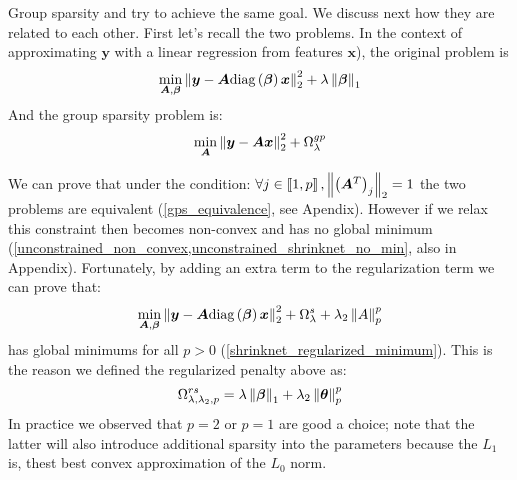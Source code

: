 Group sparsity and \shrink try to achieve the same goal. We discuss next how
they are related to each other. First let's recall the two problems. In the context of approximating $\bm{y}$ with a linear regression from features $\bm{x}$), the
original \shrink problem is 
%
\begin{equation}
  \min_{\bm{A}, \bm{\beta}} \left\lVert\bm{y} - \bm{A}\text{diag}\left(\bm{\beta}\right)\bm{x}\right\rVert_2^2 + \lambda \left\lVert\bm{\beta}\right\rVert_1
\end{equation}
%
And the group sparsity problem is:
%
\begin{equation}
  \min_{\bm{A}} \left\lVert\bm{y} - \bm{A}\bm{x}\right\rVert_2^2 + \Omega_\lambda^{gp}
\end{equation}
%

We can prove that under the condition: $\forall j\in \left\llbracket1, p\right\rrbracket,
\left\lVert\left(\bm{A}^T\right)_j\right\rVert_2 = 1$ the two problems are equivalent
(\cref{gps_equivalence}, see Apendix). However if we relax this constraint then \shrink
becomes non-convex and has no global minimum
(\cref{unconstrained_non_convex,unconstrained_shrinknet_no_min}, also in Appendix). Fortunately,
by adding an extra term to the \shrink regularization term we can prove that:
%
\begin{equation}
  \min_{\bm{A}, \bm{\beta}} \left\lVert\bm{y} - \bm{A}\text{diag}\left(\bm{\beta}\right)\bm{x}\right\rVert_2^2 + \Omega_\lambda^s + \lambda_2\left\lVert A\right\rVert_p^p
\end{equation}
%
has global minimums for all $p>0$ (\cref{shrinknet_regularized_minimum}).
This is the reason we defined the regularized \shrink penalty above as:
%
\begin{equation}
  \Omega_{\lambda, \lambda_2, p}^{rs} = \lambda\left\lVert\bm{\beta}\right\rVert_1 + \lambda_2\left\lVert\bm\theta\right\rVert_p^p
\end{equation}
%
In practice we observed that $p=2$ or $p=1$ are good a choice; note that the latter
will also introduce additional sparsity into the parameters because the $L_1$ is, 
thest best convex approximation of the $L_0$ norm.
